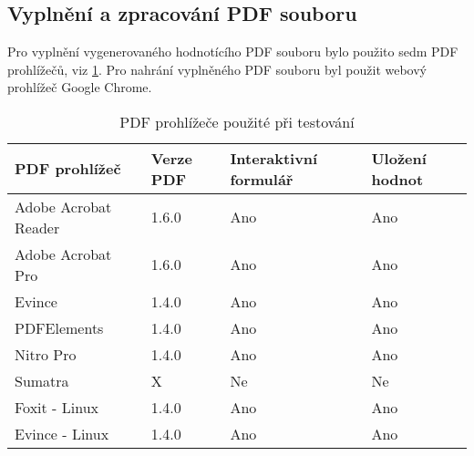 \subsection{Vyplnění a zpracování PDF souboru}
Pro vyplnění vygenerovaného hodnotícího PDF souboru bylo použito sedm PDF prohlížečů, viz \ref{tab:table_zpracovani}. Pro nahrání vyplněného PDF souboru byl použit webový prohlížeč Google Chrome.

\begin{table}[h!]
\centering
\begin{tabular}{|l|l|l|l|} 
\hline
\textbf{PDF prohlížeč} & \textbf{Verze PDF} & \textbf{Interaktivní formulář} & \textbf{Uložení hodnot}  \\ 
\hline
Adobe Acrobat Reader   & 1.6.0                & Ano                            & Ano                      \\ 
\hline
Adobe Acrobat Pro      & 1.6.0                & Ano                            & Ano                      \\ 
\hline
Evince                 & 1.4.0                & Ano                            & Ano                      \\ 
\hline
PDFElements            & 1.4.0                & Ano                            & Ano                      \\ 
\hline
Nitro Pro              & 1.4.0                & Ano                            & Ano                      \\ 
\hline
Sumatra                & X                  & Ne                             & Ne                       \\ 
\hline
Foxit - Linux          & 1.4.0                & Ano                            & Ano                      \\ 
\hline
Evince - Linux         & 1.4.0                & Ano                            & Ano                      \\
\hline
\end{tabular}
\caption{PDF prohlížeče použité při testování}
\label{tab:table_zpracovani}
\end{table}

